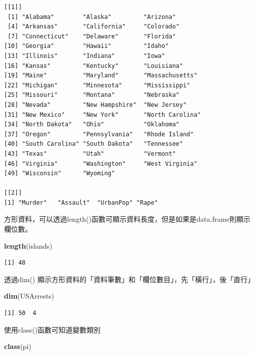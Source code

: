 \documentclass[]{book}
\newenvironment{Shaded}{\begin{snugshade}}{\end{snugshade}}
\newcommand{\KeywordTok}[1]{\textcolor[rgb]{0.13,0.29,0.53}{\textbf{#1}}}
\newcommand{\NormalTok}[1]{#1}
\theoremstyle{definition}
\theoremstyle{definition}
\theoremstyle{definition}
\theoremstyle{remark}
\begin{document}
\begin{verbatim}
[[1]]
 [1] "Alabama"        "Alaska"         "Arizona"       
 [4] "Arkansas"       "California"     "Colorado"      
 [7] "Connecticut"    "Delaware"       "Florida"       
[10] "Georgia"        "Hawaii"         "Idaho"         
[13] "Illinois"       "Indiana"        "Iowa"          
[16] "Kansas"         "Kentucky"       "Louisiana"     
[19] "Maine"          "Maryland"       "Massachusetts" 
[22] "Michigan"       "Minnesota"      "Mississippi"   
[25] "Missouri"       "Montana"        "Nebraska"      
[28] "Nevada"         "New Hampshire"  "New Jersey"    
[31] "New Mexico"     "New York"       "North Carolina"
[34] "North Dakota"   "Ohio"           "Oklahoma"      
[37] "Oregon"         "Pennsylvania"   "Rhode Island"  
[40] "South Carolina" "South Dakota"   "Tennessee"     
[43] "Texas"          "Utah"           "Vermont"       
[46] "Virginia"       "Washington"     "West Virginia" 
[49] "Wisconsin"      "Wyoming"       

[[2]]
[1] "Murder"   "Assault"  "UrbanPop" "Rape"    
\end{verbatim}

方形資料，可以透過length()函數可顯示資料長度，但是如果是data.frame則顯示欄位數。

\begin{Shaded}
\begin{Highlighting}[]
\KeywordTok{length}\NormalTok{(islands) }
\end{Highlighting}
\end{Shaded}

\begin{verbatim}
[1] 48
\end{verbatim}

透過dim()
顯示方形資料的「資料筆數」和「欄位數目」，先「橫行」，後「直行」

\begin{Shaded}
\begin{Highlighting}[]
\KeywordTok{dim}\NormalTok{(USArrests) }
\end{Highlighting}
\end{Shaded}

\begin{verbatim}
[1] 50  4
\end{verbatim}

使用class()函數可知道變數類別

\begin{Shaded}
\begin{Highlighting}[]
\KeywordTok{class}\NormalTok{(pi)}
\end{Highlighting}
\end{Shaded}
\end{document}
